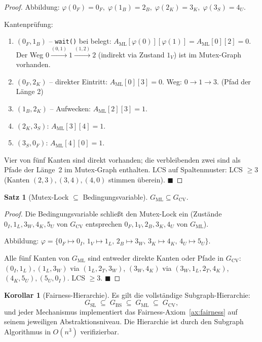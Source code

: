 ﻿\documentclass[a4paper,12pt]{article}
\theoremstyle{definition}
\newtheorem{satz}{Satz}
\newtheorem{korollar}{Korollar}
\begin{document}
\begin{proof}
Abbildung:
$\varphi(0_F) = 0_F,\;
 \varphi(1_B) = 2_B,\;
 \varphi(2_K) = 3_K,\;
 \varphi(3_S) = 4_U.$

Kantenprüfung:
\begin{enumerate}
  \item $(0_F, 1_B)$ -- \texttt{wait()} bei belegt:
        $A_{\mathrm{ML}}[\varphi(0)][\varphi(1)] = A_{\mathrm{ML}}[0][2] = 0$.
        Der Weg $0 \xrightarrow{(0,1)} 1 \xrightarrow{(1,2)} 2$
        (indirekt via Zustand $1_V$) ist im Mutex-Graph vorhanden.
  \item $(0_F, 2_K)$ -- direkter Eintritt:
        $A_{\mathrm{ML}}[0][3] = 0$.
        Weg: $0 \xrightarrow{} 1 \xrightarrow{} 3$. \checkmark (Pfad der Länge 2)
  \item $(1_B, 2_K)$ -- Aufwecken:
        $A_{\mathrm{ML}}[2][3] = 1$. \checkmark
  \item $(2_K, 3_S)$:
        $A_{\mathrm{ML}}[3][4] = 1$. \checkmark
  \item $(3_S, 0_F)$:
        $A_{\mathrm{ML}}[4][0] = 1$. \checkmark
\end{enumerate}

Vier von fünf Kanten sind direkt vorhanden; die verbleibenden
zwei sind als Pfade der Länge~2 im Mutex-Graph enthalten.
LCS auf Spaltenmuster: LCS $\geq 3$ (Kanten $(2,3), (3,4), (4,0)$
stimmen überein).
\hfill$\blacksquare$
\end{proof}

\begin{satz}[Mutex-Lock $\subseteq$ Bedingungsvariable]
\label{satz:ml_cv}
$G_{\mathrm{ML}} \subseteq G_{\mathrm{CV}}$.
\end{satz}

\begin{proof}
Die Bedingungsvariable schließt den Mutex-Lock ein (Zustände
$0_I, 1_L, 3_W, 4_K, 5_U$ von $G_{\mathrm{CV}}$ entsprechen
$0_F, 1_V, 2_B, 3_K, 4_U$ von $G_{\mathrm{ML}}$).

Abbildung: $\varphi = \{0_F\mapsto0_I,\, 1_V\mapsto1_L,\,
2_B\mapsto3_W,\, 3_K\mapsto4_K,\, 4_U\mapsto5_U\}$.

Alle fünf Kanten von $G_{\mathrm{ML}}$ sind entweder direkte
Kanten oder Pfade in $G_{\mathrm{CV}}$:
$(0_I,1_L), (1_L,3_W)$ via $(1_L,2_T,3_W)$,
$(3_W,4_K)$ via $(3_W,1_L,2_T,4_K)$, $(4_K,5_U), (5_U,0_I)$.
LCS $\geq 3$.
\hfill$\blacksquare$
\end{proof}

\begin{korollar}[Fairness-Hierarchie]
\label{kor:hier}
Es gilt die vollständige Subgraph-Hierarchie:
\[
  G_{\mathrm{SL}} \;\subseteq\;
  G_{\mathrm{BS}} \;\subseteq\;
  G_{\mathrm{ML}} \;\subseteq\;
  G_{\mathrm{CV}},
\]
und jeder Mechanismus implementiert das Fairness-Axiom~\ref{ax:fairness}
auf seinem jeweiligen Abstraktionsniveau.
Die Hierarchie ist durch den Subgraph Algorithmus in $O(n^3)$ verifizierbar.
\end{korollar}
\end{document}
